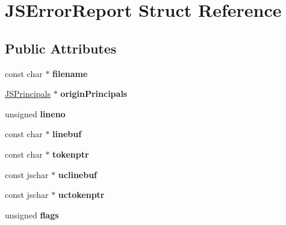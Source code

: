 \hypertarget{struct_j_s_error_report}{\section{J\-S\-Error\-Report Struct Reference}
\label{struct_j_s_error_report}
}
\subsection*{Public Attributes}
\begin{DoxyCompactItemize}
\item 
\hypertarget{struct_j_s_error_report_a622b0d939c3df51df94f82e83a7d93c9}{const char $\ast$ {\bfseries filename}}\label{struct_j_s_error_report_a622b0d939c3df51df94f82e83a7d93c9}

\item 
\hypertarget{struct_j_s_error_report_a05e2525abed7bf822583cdf5966c435c}{\hyperlink{struct_j_s_principals}{J\-S\-Principals} $\ast$ {\bfseries origin\-Principals}}\label{struct_j_s_error_report_a05e2525abed7bf822583cdf5966c435c}

\item 
\hypertarget{struct_j_s_error_report_a195dbb7773cb9a141709173f53baf3cb}{unsigned {\bfseries lineno}}\label{struct_j_s_error_report_a195dbb7773cb9a141709173f53baf3cb}

\item 
\hypertarget{struct_j_s_error_report_ad64ba986cb2f08443d31510b599d3e03}{const char $\ast$ {\bfseries linebuf}}\label{struct_j_s_error_report_ad64ba986cb2f08443d31510b599d3e03}

\item 
\hypertarget{struct_j_s_error_report_a0d5e825b97e8049c0b79876efaae3201}{const char $\ast$ {\bfseries tokenptr}}\label{struct_j_s_error_report_a0d5e825b97e8049c0b79876efaae3201}

\item 
\hypertarget{struct_j_s_error_report_a62e4087d69caae39452b21f8b007a684}{const jschar $\ast$ {\bfseries uclinebuf}}\label{struct_j_s_error_report_a62e4087d69caae39452b21f8b007a684}

\item 
\hypertarget{struct_j_s_error_report_a32219f57b01956b3a8c5649f0a9cd919}{const jschar $\ast$ {\bfseries uctokenptr}}\label{struct_j_s_error_report_a32219f57b01956b3a8c5649f0a9cd919}

\item 
\hypertarget{struct_j_s_error_report_aa50fa4a993468a490964c0ccb6b5a6b3}{unsigned {\bfseries flags}}\label{struct_j_s_error_report_aa50fa4a993468a490964c0ccb6b5a6b3}


\end{DoxyCompactItemize}
